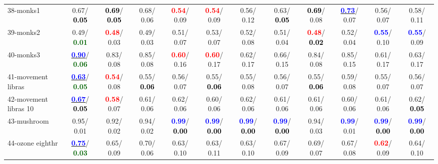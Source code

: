 \begin{table}[h]
\begin{center}
{\begin{tabular}{lc|c|c|c|c|c|c|c|c|c|c}
38-monks1 &   0.67/\textcolor{black}{\textbf{  0.05}} & \textcolor{black}{\textbf{  0.69}}/\textcolor{black}{\textbf{  0.05}} &   0.68/  0.06 & \textcolor{red}{\textbf{  0.54}}/  0.09 & \textcolor{red}{\textbf{  0.54}}/  0.09 &   0.56/  0.12 &   0.63/\textcolor{black}{\textbf{  0.05}} & \textcolor{black}{\textbf{  0.69}}/  0.08 & \underline{\textcolor{blue}{\textbf{  0.73}}}/  0.07 &   0.56/  0.07 &   0.58/  0.11 \\
39-monks2 &   0.49/\textcolor{darkgreen}{\textbf{  0.01}} & \textcolor{red}{\textbf{  0.48}}/  0.03 &   0.49/  0.03 &   0.51/  0.07 &   0.53/  0.07 &   0.52/  0.08 &   0.51/  0.04 & \textcolor{red}{\textbf{  0.48}}/\textcolor{black}{\textbf{  0.02}} &   0.52/  0.04 & \textcolor{blue}{\textbf{  0.55}}/  0.10 & \textcolor{blue}{\textbf{  0.55}}/  0.09 \\ \hline
40-monks3 & \underline{\textcolor{blue}{\textbf{  0.90}}}/\textcolor{darkgreen}{\textbf{  0.06}} &   0.83/  0.08 &   0.85/  0.08 & \textcolor{red}{\textbf{  0.60}}/  0.16 & \textcolor{red}{\textbf{  0.60}}/  0.17 &   0.62/  0.17 &   0.66/  0.15 &   0.84/  0.08 &   0.85/  0.15 &   0.61/  0.17 &   0.63/  0.17 \\
41-movement libras & \underline{\textcolor{blue}{\textbf{  0.63}}}/\textcolor{darkgreen}{\textbf{  0.05}} & \textcolor{red}{\textbf{  0.54}}/  0.08 &   0.55/\textcolor{black}{\textbf{  0.06}} &   0.56/  0.07 &   0.55/\textcolor{black}{\textbf{  0.06}} &   0.55/  0.08 &   0.56/  0.07 &   0.55/\textcolor{black}{\textbf{  0.06}} &   0.59/  0.08 &   0.55/  0.07 &   0.56/  0.07 \\
42-movement libras 10 & \underline{\textcolor{blue}{\textbf{  0.67}}}/\textcolor{black}{\textbf{  0.05}} & \textcolor{red}{\textbf{  0.58}}/  0.07 &   0.61/  0.06 &   0.62/  0.06 &   0.60/  0.06 &   0.62/  0.06 &   0.61/  0.06 &   0.61/  0.06 &   0.60/  0.06 &   0.61/  0.06 &   0.62/\textcolor{black}{\textbf{  0.05}} \\
43-mushroom &   0.95/  0.01 &   0.92/  0.02 &   0.94/  0.02 & \textcolor{blue}{\textbf{  0.99}}/\textcolor{black}{\textbf{  0.00}} & \textcolor{blue}{\textbf{  0.99}}/\textcolor{black}{\textbf{  0.00}} & \textcolor{blue}{\textbf{  0.99}}/\textcolor{black}{\textbf{  0.00}} & \textcolor{blue}{\textbf{  0.99}}/\textcolor{black}{\textbf{  0.00}} &   0.94/  0.03 & \textcolor{blue}{\textbf{  0.99}}/  0.01 & \textcolor{blue}{\textbf{  0.99}}/\textcolor{black}{\textbf{  0.00}} & \textcolor{blue}{\textbf{  0.99}}/\textcolor{black}{\textbf{  0.00}} \\
44-ozone eighthr & \underline{\textcolor{blue}{\textbf{  0.75}}}/\textcolor{darkgreen}{\textbf{  0.03}} &   0.65/  0.09 &   0.70/  0.06 &   0.63/  0.10 &   0.63/  0.11 &   0.63/  0.10 &   0.67/  0.09 &   0.69/  0.07 &   0.67/  0.08 & \textcolor{red}{\textbf{  0.62}}/  0.09 &   0.64/  0.10 \\

\end{tabular}}
\end{center}
\end{table}
